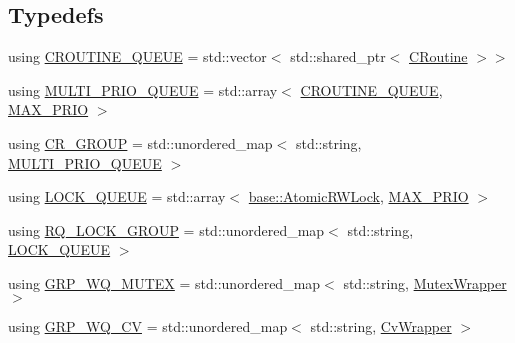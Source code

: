 \subsection*{Typedefs}
\begin{DoxyCompactItemize}
\item 
using \hyperlink{namespaceapollo_1_1cyber_1_1scheduler_a9785cbbdaf553a63e7ecb89e007326e5}{C\-R\-O\-U\-T\-I\-N\-E\-\_\-\-Q\-U\-E\-U\-E} = std\-::vector$<$ std\-::shared\-\_\-ptr$<$ \hyperlink{classapollo_1_1cyber_1_1croutine_1_1CRoutine}{C\-Routine} $>$$>$
\item 
using \hyperlink{namespaceapollo_1_1cyber_1_1scheduler_ac66e3c3cdda21d9be8ea0692401913a2}{M\-U\-L\-T\-I\-\_\-\-P\-R\-I\-O\-\_\-\-Q\-U\-E\-U\-E} = std\-::array$<$ \hyperlink{namespaceapollo_1_1cyber_1_1scheduler_a9785cbbdaf553a63e7ecb89e007326e5}{C\-R\-O\-U\-T\-I\-N\-E\-\_\-\-Q\-U\-E\-U\-E}, \hyperlink{namespaceapollo_1_1cyber_1_1scheduler_a9bc4ff591ee6d0710ed99d197b4ce9d2}{M\-A\-X\-\_\-\-P\-R\-I\-O} $>$
\item 
using \hyperlink{namespaceapollo_1_1cyber_1_1scheduler_aea5742ba3cc52566de1eeeeaac1a8714}{C\-R\-\_\-\-G\-R\-O\-U\-P} = std\-::unordered\-\_\-map$<$ std\-::string, \hyperlink{namespaceapollo_1_1cyber_1_1scheduler_ac66e3c3cdda21d9be8ea0692401913a2}{M\-U\-L\-T\-I\-\_\-\-P\-R\-I\-O\-\_\-\-Q\-U\-E\-U\-E} $>$
\item 
using \hyperlink{namespaceapollo_1_1cyber_1_1scheduler_a714aab7bf591e6d2f48fafdbbb1dda02}{L\-O\-C\-K\-\_\-\-Q\-U\-E\-U\-E} = std\-::array$<$ \hyperlink{classapollo_1_1cyber_1_1base_1_1AtomicRWLock}{base\-::\-Atomic\-R\-W\-Lock}, \hyperlink{namespaceapollo_1_1cyber_1_1scheduler_a9bc4ff591ee6d0710ed99d197b4ce9d2}{M\-A\-X\-\_\-\-P\-R\-I\-O} $>$
\item 
using \hyperlink{namespaceapollo_1_1cyber_1_1scheduler_ad4f939996840b0f02dafc9a779dfefd7}{R\-Q\-\_\-\-L\-O\-C\-K\-\_\-\-G\-R\-O\-U\-P} = std\-::unordered\-\_\-map$<$ std\-::string, \hyperlink{namespaceapollo_1_1cyber_1_1scheduler_a714aab7bf591e6d2f48fafdbbb1dda02}{L\-O\-C\-K\-\_\-\-Q\-U\-E\-U\-E} $>$
\item 
using \hyperlink{namespaceapollo_1_1cyber_1_1scheduler_a38dec21bb0dcc34727c9a215020abb70}{G\-R\-P\-\_\-\-W\-Q\-\_\-\-M\-U\-T\-E\-X} = std\-::unordered\-\_\-map$<$ std\-::string, \hyperlink{classapollo_1_1cyber_1_1scheduler_1_1MutexWrapper}{Mutex\-Wrapper} $>$
\item 
using \hyperlink{namespaceapollo_1_1cyber_1_1scheduler_aaaf29077b955c494a8b6ef756e02ed4d}{G\-R\-P\-\_\-\-W\-Q\-\_\-\-C\-V} = std\-::unordered\-\_\-map$<$ std\-::string, \hyperlink{classapollo_1_1cyber_1_1scheduler_1_1CvWrapper}{Cv\-Wrapper} $>$
\end{DoxyCompactItemize}
